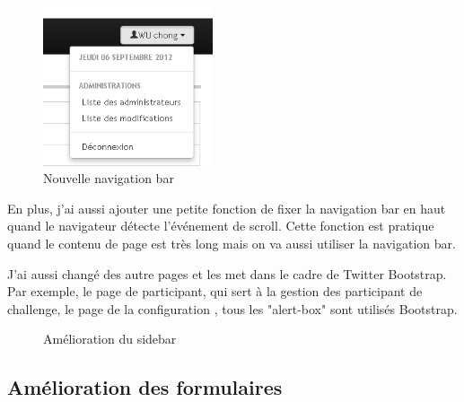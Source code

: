  \begin{figure}[hbtp]
\center
\includegraphics[width=5cm]{body/images/info-connexion.png}
\caption{Nouvelle navigation bar}
\end{figure}

En plus, j'ai aussi ajouter une petite fonction de fixer la navigation bar en haut quand le navigateur détecte l'événement de scroll. Cette fonction est pratique quand le contenu de page est très long mais on va aussi utiliser la navigation bar.

J'ai aussi changé des autre pages et les met dans le cadre de Twitter Bootstrap. Par exemple, le page de participant, qui sert à la gestion des participant de challenge, le page de la configuration , tous les "alert-box" sont utilisés Bootstrap.
\begin{figure}
  \centering
  \caption{Amélioration du sidebar}
\end{figure}



\subsection{Amélioration des formulaires}

